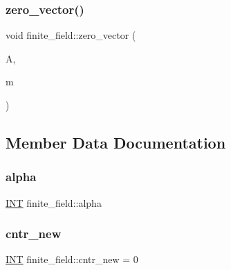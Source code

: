 \mbox{\label{classfinite__field_aa2c5904f96c01093ba6914fc3a1239d8}} 
\subsubsection{\texorpdfstring{zero\+\_\+vector()}{zero\_vector()}}
{\footnotesize\ttfamily void finite\+\_\+field\+::zero\+\_\+vector (\begin{DoxyParamCaption}\item[{\mbox{\hyperlink{galois_8h_a09fddde158a3a20bd2dcadb609de11dc}{I\+NT}} $\ast$}]{A,  }\item[{\mbox{\hyperlink{galois_8h_a09fddde158a3a20bd2dcadb609de11dc}{I\+NT}}}]{m }\end{DoxyParamCaption})}



\subsection{Member Data Documentation}
\mbox{\label{classfinite__field_a5fbda70e8d5b9930f276022bd59fcd70}} 
\subsubsection{\texorpdfstring{alpha}{alpha}}
{\footnotesize\ttfamily \mbox{\hyperlink{galois_8h_a09fddde158a3a20bd2dcadb609de11dc}{I\+NT}} finite\+\_\+field\+::alpha}

\mbox{\label{classfinite__field_a4e170fbf1130aba4c2a9d40199727083}} 
\subsubsection{\texorpdfstring{cntr\+\_\+new}{cntr\_new}}
{\footnotesize\ttfamily \mbox{\hyperlink{galois_8h_a09fddde158a3a20bd2dcadb609de11dc}{I\+NT}} finite\+\_\+field\+::cntr\+\_\+new = 0\hspace{0.3cm}{\ttfamily [static]}}

